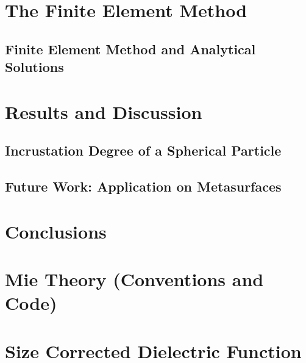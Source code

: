 \documentclass[11pt]{Latex/Classes/PhDthesisPSnPDF}
\begin{document}
\chapter{The Finite Element Method}
\label{chapter:FEM}



	\section{Finite Element Method and Analytical Solutions}
		\label{sec:FEM-Mie}
%		

%

\chapter{Results and Discussion}
%	
	\section{Incrustation Degree of a Spherical Particle}
%	
    \section{Future Work: Application on Metasurfaces}

\chapter{Conclusions}


\appendix

\chapter{Mie Theory (Conventions and Code)}
  \label{app:MieCode}
  

\chapter{Size Corrected Dielectric Function}
  \label{app:SizeCorrection}
  


%
%

\setlength{}
\printbibliography

\newpage
\listoffigures              %
\printindex
\end{document}
